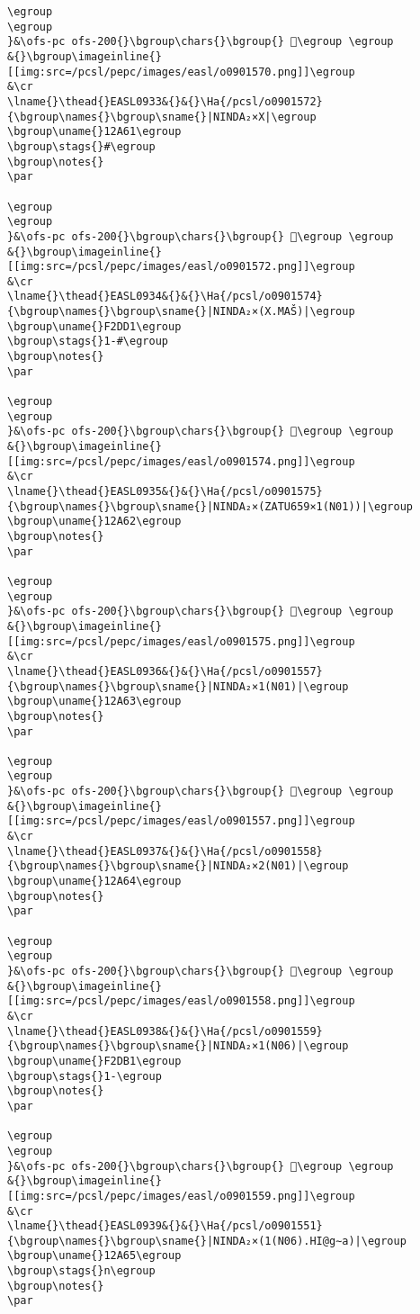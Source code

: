 \begin{verbatim}
\egroup
\egroup
}&\ofs-pc ofs-200{}\bgroup\chars{}\bgroup{} 𒩟\egroup \egroup
&{}\bgroup\imageinline{}[[img:src=/pcsl/pepc/images/easl/o0901570.png]]\egroup
&\cr
\lname{}\thead{}EASL0933&{}&{}\Ha{/pcsl/o0901572}{\bgroup\names{}\bgroup\sname{}|NINDA₂×X|\egroup
\bgroup\uname{}12A61\egroup
\bgroup\stags{}#\egroup
\bgroup\notes{}
\par 

\egroup
\egroup
}&\ofs-pc ofs-200{}\bgroup\chars{}\bgroup{} 𒩡\egroup \egroup
&{}\bgroup\imageinline{}[[img:src=/pcsl/pepc/images/easl/o0901572.png]]\egroup
&\cr
\lname{}\thead{}EASL0934&{}&{}\Ha{/pcsl/o0901574}{\bgroup\names{}\bgroup\sname{}|NINDA₂×(X.MAŠ)|\egroup
\bgroup\uname{}F2DD1\egroup
\bgroup\stags{}1-#\egroup
\bgroup\notes{}
\par 

\egroup
\egroup
}&\ofs-pc ofs-200{}\bgroup\chars{}\bgroup{} 󲷑\egroup \egroup
&{}\bgroup\imageinline{}[[img:src=/pcsl/pepc/images/easl/o0901574.png]]\egroup
&\cr
\lname{}\thead{}EASL0935&{}&{}\Ha{/pcsl/o0901575}{\bgroup\names{}\bgroup\sname{}|NINDA₂×(ZATU659×1(N01))|\egroup
\bgroup\uname{}12A62\egroup
\bgroup\notes{}
\par 

\egroup
\egroup
}&\ofs-pc ofs-200{}\bgroup\chars{}\bgroup{} 𒩢\egroup \egroup
&{}\bgroup\imageinline{}[[img:src=/pcsl/pepc/images/easl/o0901575.png]]\egroup
&\cr
\lname{}\thead{}EASL0936&{}&{}\Ha{/pcsl/o0901557}{\bgroup\names{}\bgroup\sname{}|NINDA₂×1(N01)|\egroup
\bgroup\uname{}12A63\egroup
\bgroup\notes{}
\par 

\egroup
\egroup
}&\ofs-pc ofs-200{}\bgroup\chars{}\bgroup{} 𒩣\egroup \egroup
&{}\bgroup\imageinline{}[[img:src=/pcsl/pepc/images/easl/o0901557.png]]\egroup
&\cr
\lname{}\thead{}EASL0937&{}&{}\Ha{/pcsl/o0901558}{\bgroup\names{}\bgroup\sname{}|NINDA₂×2(N01)|\egroup
\bgroup\uname{}12A64\egroup
\bgroup\notes{}
\par 

\egroup
\egroup
}&\ofs-pc ofs-200{}\bgroup\chars{}\bgroup{} 𒩤\egroup \egroup
&{}\bgroup\imageinline{}[[img:src=/pcsl/pepc/images/easl/o0901558.png]]\egroup
&\cr
\lname{}\thead{}EASL0938&{}&{}\Ha{/pcsl/o0901559}{\bgroup\names{}\bgroup\sname{}|NINDA₂×1(N06)|\egroup
\bgroup\uname{}F2DB1\egroup
\bgroup\stags{}1-\egroup
\bgroup\notes{}
\par 

\egroup
\egroup
}&\ofs-pc ofs-200{}\bgroup\chars{}\bgroup{} 󲶱\egroup \egroup
&{}\bgroup\imageinline{}[[img:src=/pcsl/pepc/images/easl/o0901559.png]]\egroup
&\cr
\lname{}\thead{}EASL0939&{}&{}\Ha{/pcsl/o0901551}{\bgroup\names{}\bgroup\sname{}|NINDA₂×(1(N06).HI@g∼a)|\egroup
\bgroup\uname{}12A65\egroup
\bgroup\stags{}n\egroup
\bgroup\notes{}
\par 


\end{verbatim}
